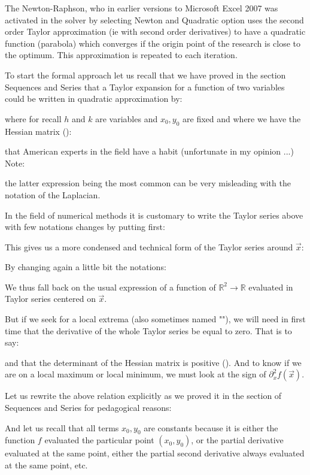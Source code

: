 	The Newton-Raphson, who in earlier versions to Microsoft Excel 2007 was activated in the solver by selecting Newton and Quadratic option uses the second order Taylor approximation (ie with second order derivatives) to have a quadratic function (parabola) which converges if the origin point of the research is close to the optimum. This approximation is repeated to each iteration.

	To start the formal approach let us recall that we have proved in the section Sequences and Series that a Taylor expansion for a function of two variables could be written in quadratic approximation by:
	
	where for recall $h$ and $k$ are variables and $x_0,y_0$ are fixed and where we have the Hessian matrix ():
	
	that American experts in the field have a habit (unfortunate in my opinion ...) Note:
	
	the latter expression being the most common can be very misleading with the notation of the Laplacian.

	In the field of numerical methods it is customary to write the Taylor series above with few notations changes by putting first:
	
	This gives us a more condensed and technical form of the Taylor series around $\vec{x}$:
	
	By changing again a little bit the notations:
	
	We thus fall back on the usual expression of a function of $\mathbb{R}^2\rightarrow \mathbb{R}$ evaluated in Taylor series centered on $\vec{x}$.

	But if we seek for a local extrema (also sometimes named ""), we will need in first time that the derivative of the whole Taylor series be equal to zero. That is to say:
	
	and that the determinant of the Hessian matrix is positive (). And to know if we are on a local maximum or local minimum, we must look at the sign of $\partial_x^2 f(\vec{x})$.

	Let us rewrite the above relation explicitly as we proved it in the section of Sequences and Series for pedagogical reasons:
	
	And let us recall that all terms $x_0,y_0$ are constants because it is either the function $f$ evaluated the particular point $(x_0,y_0)$, or the partial derivative evaluated at the same point, either the partial second derivative always evaluated at the same point, etc.


